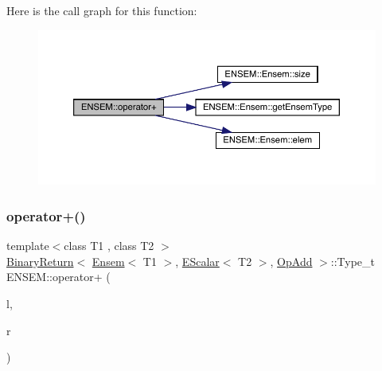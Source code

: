 Here is the call graph for this function\+:\nopagebreak
\begin{figure}[H]
\begin{center}
\leavevmode
\includegraphics[width=350pt]{d1/d9e/group__eensem_ga724a1c256d14ef567ac649b0ae8df485_cgraph}
\end{center}
\end{figure}
\mbox{\label{group__eensem_ga370913e6f39a2b7be0ce0b78f156978a}} 
\subsubsection{\texorpdfstring{operator+()}{operator+()}\hspace{0.1cm}{\footnotesize\ttfamily [3/4]}}
{\footnotesize\ttfamily template$<$class T1 , class T2 $>$ \\
\mbox{\hyperlink{structENSEM_1_1BinaryReturn}{Binary\+Return}}$<$ \mbox{\hyperlink{classENSEM_1_1Ensem}{Ensem}}$<$ T1 $>$, \mbox{\hyperlink{classENSEM_1_1EScalar}{E\+Scalar}}$<$ T2 $>$, \mbox{\hyperlink{structENSEM_1_1OpAdd}{Op\+Add}} $>$\+::Type\+\_\+t E\+N\+S\+E\+M\+::operator+ (\begin{DoxyParamCaption}\item[{const \mbox{\hyperlink{classENSEM_1_1Ensem}{Ensem}}$<$ T1 $>$ \&}]{l,  }\item[{const \mbox{\hyperlink{classENSEM_1_1EScalar}{E\+Scalar}}$<$ T2 $>$ \&}]{r }\end{DoxyParamCaption})\hspace{0.3cm}{\ttfamily [inline]}}

